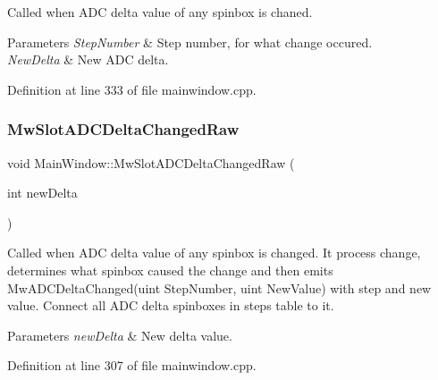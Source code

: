 Called when A\+DC delta value of any spinbox is chaned. 


\begin{DoxyParams}{Parameters}
{\em Step\+Number} & Step number, for what change occured. \\
\hline
{\em New\+Delta} & New A\+DC delta. \\
\hline
\end{DoxyParams}


Definition at line 333 of file mainwindow.\+cpp.

\mbox{\label{class_main_window_acbdfd3592779f6946c4fecc33c79e9a4}} 
\subsubsection{\texorpdfstring{Mw\+Slot\+A\+D\+C\+Delta\+Changed\+Raw}{MwSlotADCDeltaChangedRaw}}
{\footnotesize\ttfamily void Main\+Window\+::\+Mw\+Slot\+A\+D\+C\+Delta\+Changed\+Raw (\begin{DoxyParamCaption}\item[{int}]{new\+Delta }\end{DoxyParamCaption})\hspace{0.3cm}{\ttfamily [slot]}}



Called when A\+DC delta value of any spinbox is changed. It process change, determines what spinbox caused the change and then emits Mw\+A\+D\+C\+Delta\+Changed(uint Step\+Number, uint New\+Value) with step and new value. Connect all A\+DC delta spinboxes in steps table to it. 


\begin{DoxyParams}{Parameters}
{\em new\+Delta} & New delta value. \\
\hline
\end{DoxyParams}


Definition at line 307 of file mainwindow.\+cpp.

\mbox{\label{class_main_window_aaf5b44955c0c93824ea89edd3cdc5730}} 

